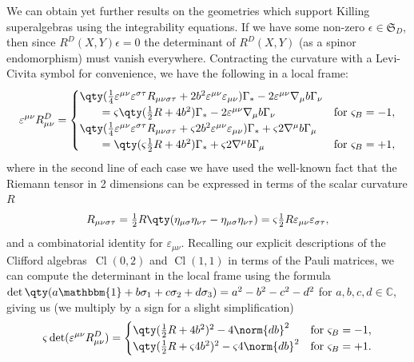 \documentclass[10pt,a4paper]{amsart}
\numberwithin{equation}{section}
\newcommand{\fS}{\mathfrak{S}}
\newcommand{\CC}{\mathbb{C}}
\newcommand{\1}{\mathbbm{1}}
\DeclareMathOperator{\Cl}{Cl}
\begin{document}
We can obtain yet further results on the geometries which support Killing superalgebras using the integrability equations. If we have some non-zero $\epsilon\in\fS_D$, then since $R^D(X,Y)\epsilon=0$ the determinant of $R^D(X,Y)$ (as a spinor endomorphism) must vanish everywhere. Contracting the curvature with a Levi-Civita symbol for convenience, we have the following in a local frame:
\begin{equation}\label{eq:2d-D-curvature-comps}
	\varepsilon^{\mu\nu}R^D_{\mu\nu} =
		\begin{cases}
			\qty(\frac{1}{4}\varepsilon^{\mu\nu}\varepsilon^{\sigma\tau}R_{\mu\nu\sigma\tau} + 2b^2\varepsilon^{\mu\nu}\varepsilon_{\mu\nu})\Gamma_* - 2\varepsilon^{\mu\nu}\nabla_\mu b\Gamma_\nu
			\\
			\qquad=\varsigma\qty(\frac{1}{2}R + 4b^2)\Gamma_* - 2\varepsilon^{\mu\nu}\nabla_\mu b\Gamma_\nu
				& \text{for } \varsigma_B=-1,
			\\	
			\qty(\frac{1}{4}\varepsilon^{\mu\nu}\varepsilon^{\sigma\tau}R_{\mu\nu\sigma\tau} + \varsigma 2b^2\varepsilon^{\mu\nu}\varepsilon_{\mu\nu})\Gamma_* + \varsigma2\nabla^\mu b\Gamma_\mu
			\\
			\qquad= \qty(\varsigma\frac{1}{2}R + 4b^2)\Gamma_* + \varsigma 2\nabla^\mu b\Gamma_\mu
				& \text{for } \varsigma_B=+1,
		\end{cases}
\end{equation}
where in the second line of each case we have used the well-known fact that the Riemann tensor in 2 dimensions can be expressed in terms of the scalar curvature $R$
\[
	R_{\mu\nu\sigma\tau}=\tfrac{1}{2}R\qty(\eta_{\mu\sigma}\eta_{\nu\tau}-\eta_{\mu\sigma}\eta_{\nu\tau}) =\varsigma\tfrac{1}{2}R\varepsilon_{\mu\nu}\varepsilon_{\sigma\tau},
\]
and a combinatorial identity for $\varepsilon_{\mu\nu}$. Recalling our explicit descriptions of the Clifford algebras~$\Cl(0,2)$ and $\Cl(1,1)$ in terms of the Pauli matrices, we can compute the determinant in the local frame using the formula
$\det\qty(a\1 + b\sigma_1 + c\sigma_2 + d\sigma_3) = a^2 - b^2 - c^2 - d^2
$
for $a,b,c,d\in\CC$, giving us (we multiply by a sign for a slight simplification)
\begin{equation}\label{eq:2d-real-curv-det}
	\varsigma\det(\varepsilon^{\mu\nu}R^D_{\mu\nu}) =
		\begin{cases}
			\qty(\frac{1}{2}R + 4b^2)^2 - 4\norm{db}^2
				& \text{for } \varsigma_B=-1,
			\\	
			\qty(\frac{1}{2}R + \varsigma 4b^2)^2 - \varsigma 4\norm{db}^2
				& \text{for } \varsigma_B=+1.
		\end{cases}
\end{equation}
\end{document}
